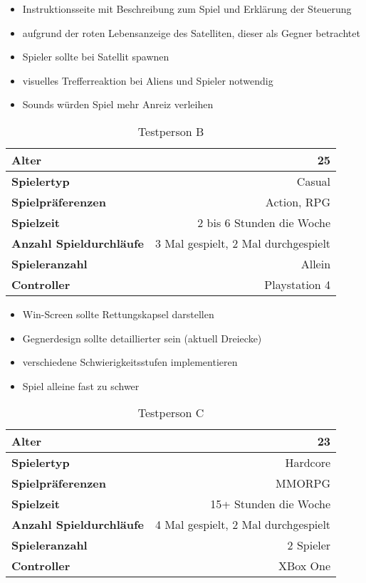 \documentclass[11pt]{scrartcl}
\begin{document}
\vspace{-6mm}
\begin{itemize}
\setlength{\parskip}{0pt}
\item Instruktionsseite mit Beschreibung zum Spiel und Erklärung der Steuerung
\item aufgrund der roten Lebensanzeige des Satelliten, dieser als Gegner betrachtet
\item Spieler sollte bei Satellit spawnen
\item visuelles Trefferreaktion bei Aliens und Spieler notwendig
\item Sounds würden Spiel mehr Anreiz verleihen
\end{itemize}

\begin{table}[htp]
\centering
\begin{tabular}{|l|r|}
\hline
\textbf{Alter} &25\\
\hline
\textbf{Spielertyp} &Casual\\
\hline
\textbf{Spielpräferenzen} &Action, RPG\\
\hline
\textbf{Spielzeit} &2 bis 6 Stunden die Woche\\
\hline
\textbf{Anzahl Spieldurchläufe} &3 Mal gespielt, 2 Mal durchgespielt\\
\hline
\textbf{Spieleranzahl} &Allein\\
\hline
\textbf{Controller} &Playstation 4\\
\hline
\end{tabular}
\caption{Testperson B}
\label{tab:test-b}
\end{table}

\begin{itemize}
\setlength{\parskip}{0pt}
\item Win-Screen sollte Rettungskapsel darstellen
\item Gegnerdesign sollte detaillierter sein (aktuell Dreiecke)
\item verschiedene Schwierigkeitsstufen implementieren
\item Spiel alleine fast zu schwer
\end{itemize}

\begin{table}[htp]
\centering
\begin{tabular}{|l|r|}
\hline
\textbf{Alter} &23\\
\hline
\textbf{Spielertyp} &Hardcore\\
\hline
\textbf{Spielpräferenzen} &MMORPG\\
\hline
\textbf{Spielzeit} &15+ Stunden die Woche\\
\hline
\textbf{Anzahl Spieldurchläufe} &4 Mal gespielt, 2 Mal durchgespielt\\
\hline
\textbf{Spieleranzahl} &2 Spieler\\
\hline
\textbf{Controller} &XBox One\\
\hline
\end{tabular}
\caption{Testperson C}
\label{tab:test-c}
\end{table}
\end{document}
